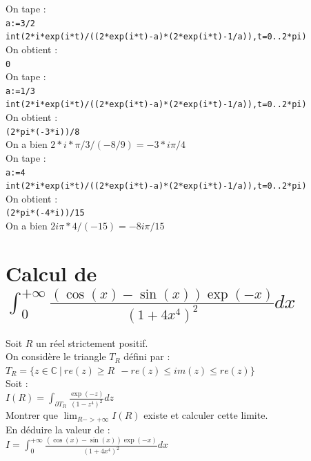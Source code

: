 \documentclass[a4paper,11pt]{book}
\newcommand{\C}{{\mathbb{C}}}
\begin{document}
On tape :\\
{\tt a:=3/2}\\
{\tt int(2*i*exp(i*t)/((2*exp(i*t)-a)*(2*exp(i*t)-1/a)),t=0..2*pi)}\\
On obtient :\\
{\tt 0}\\
On tape :\\
{\tt a:=1/3}\\
{\tt int(2*i*exp(i*t)/((2*exp(i*t)-a)*(2*exp(i*t)-1/a)),t=0..2*pi)}\\
On obtient :\\
{\tt (2*pi*(-3*i))/8}\\
On a bien $2*i*\pi/3/(-8/9)=-3*i\pi/4$\\
On tape :\\
{\tt a:=4}\\
{\tt int(2*i*exp(i*t)/((2*exp(i*t)-a)*(2*exp(i*t)-1/a)),t=0..2*pi)}\\
On obtient :\\
{\tt (2*pi*(-4*i))/15}\\
On a bien $2i\pi*4/(-15)=-8i\pi/15$

\section{Calcul de $\int_0^{+\infty}\frac{(\cos(x)-\sin(x))\exp(-x)}{(1+4x^4)^2}dx$}
Soit $R$ un r\'eel strictement positif.\\
On consid\`ere le triangle $T_R$ d\'efini par :\\
$\displaystyle T_R=\{z \in \C\ |\  re(z)\geq R\ \ -re(z) \leq im(z) \leq re(z)\}$\\
Soit :\\
$\displaystyle I(R)=\int_{\partial T_R}\frac{\exp(-z)}{(1-z^4)^2}dz$\\
Montrer que $\displaystyle \lim_{R->+\infty}I(R)$ existe et calculer cette limite.\\
En d\'eduire la valeur de :\\
$\displaystyle I=\int_0^{+\infty}\frac{(\cos(x)-\sin(x))\exp(-x)}{(1+4x^4)^2}dx$
\end{document}
